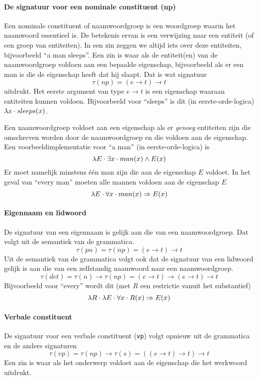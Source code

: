\paragraph{De signatuur voor een nominale constituent (np)} Een nominale constituent of naamwoordgroep is een woordgroep waarin het naamwoord essentieel is. De betekenis ervan is een verwijzing naar een entiteit (of een groep van entiteiten). In een zin zeggen we altijd iets over deze entiteiten, bijvoorbeeld ``a man sleeps''. Een zin is waar als de entiteit(en) van de naamwoordgroep voldoen aan een bepaalde eigenschap, bijvoorbeeld als er een man is die de eigenschap heeft dat hij slaapt. Dat is wat signatuur $$\tau(np) = (e \to t) \to t$$ uitdrukt. Het eerste argument van type $e \to t$ is een eigenschap waaraan entiteiten kunnen voldoen. Bijvoorbeeld voor ``sleeps'' is dit (in eerste-orde-logica) $\lambda x \cdot sleeps(x)$.

Een naamwoordgroep voldoet aan een eigenschap als er \textit{genoeg} entiteiten zijn die omschreven worden door de naamwoordgroep en die voldoen aan de eigenschap. Een voorbeeldimplementatie voor ``a man'' (in eerste-orde-logica) is $$\lambda E \cdot \exists x \cdot man(x) \land E(x)$$ Er moet namelijk minstens één man zijn die aan de eigenschap $E$ voldoet. In het geval van ``every man'' moeten alle mannen voldoen aan de eigenschap $E$ $$\lambda E \cdot \forall x \cdot man(x) \Rightarrow E(x)$$

\paragraph{Eigennaam en lidwoord} De signatuur van een eigennaam is gelijk aan die van een naamwoordgroep. Dat volgt uit de semantiek van de grammatica. $$\tau(pn) = \tau(np) = (e \rightarrow t) \rightarrow t$$ Uit de semantiek van de grammatica volgt ook dat de signatuur van een lidwoord gelijk is aan die van een zelfstandig naamwoord naar een naamwoordgroep. $$ \tau(det) = \tau(n) \rightarrow \tau(np) = (e \to t) \rightarrow (e \rightarrow t) \rightarrow t$$ Bijvoorbeeld voor ``every'' wordt dit (met $R$ een restrictie vanuit het substantief) $$\lambda R \cdot \lambda E \cdot \forall x \cdot R(x) \Rightarrow E(x)$$

\paragraph{Verbale constituent} De signatuur voor een verbale constituent (\texttt{vp}) volgt opnieuw uit de grammatica en de andere signaturen $$\tau(vp) = \tau(np) \rightarrow \tau(s) = ((e \rightarrow t) \rightarrow t) \rightarrow t$$ Een zin is waar als het onderwerp voldoet aan de eigenschap die het werkwoord uitdrukt.

